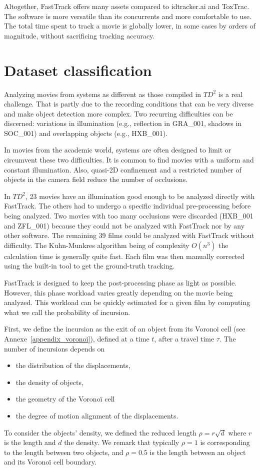     Altogether, FastTrack offers many assets compared to idtracker.ai and ToxTrac. The software is more versatile than its concurrents and more comfortable to use. The total time spent to track a movie is globally lower, in some cases by orders of magnitude, without sacrificing tracking accuracy.

	\section{Dataset classification}
    \label{pinc}
    Analyzing movies from systems as different as those compiled in $TD^2$ is a real challenge. That is partly due to the recording conditions that can be very diverse and make object detection more complex. Two recurring difficulties can be discerned: variations in illumination (e.g., reflection in GRA\_001, shadows in SOC\_001) and overlapping objects (e.g., HXB\_001).

    In movies from the academic world, systems are often designed to limit or circumvent these two difficulties. It is common to find movies with a uniform and constant illumination. Also, quasi-2D confinement and a restricted number of objects in the camera field reduce the number of occlusions.

    In $TD^2$, 23 movies have an illumination good enough to be analyzed directly with FastTrack. The others had to undergo a specific individual pre-processing before being analyzed. Two movies with too many occlusions were discarded (HXB\_001 and ZFL\_001) because they could not be analyzed with FastTrack nor by any other software.
    The remaining 39 films could be analyzed with FastTrack without difficulty. The Kuhn-Munkres algorithm being of complexity $O(n^3)$ the calculation time is generally quite fast. Each film was then manually corrected using the built-in tool to get the ground-truth tracking.

    FastTrack is designed to keep the post-processing phase as light as possible. However, this phase workload varies greatly depending on the movie being analyzed. This workload can be quickly estimated for a given film by computing what we call the probability of incursion.

    First, we define the incursion as the exit of an object from its Voronoi cell (see Annexe~\ref{appendix_voronoi}), defined at a time $t$, after a travel time $\tau$. The number of incursions depends on
    \begin{itemize}
    \item the distribution of the displacements,
    \item the density of objects,
    \item the geometry of the Voronoï cell
    \item the degree of motion alignment of the displacements.
    \end{itemize}
    To consider the objects' density, we defined the reduced length $\rho=r\sqrt{d}$ where $r$ is the length and $d$ the density. We remark that typically $\rho=1$ is corresponding to the length between two objects, and $\rho=0.5$ is the length between an object and its Voronoï cell boundary.

